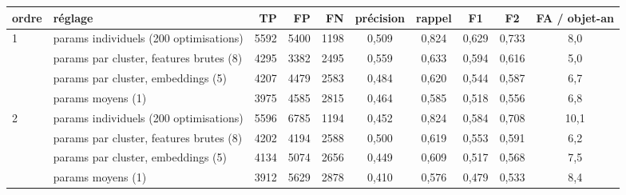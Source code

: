 \begin{tabular}{llrrrccccc}
\toprule
ordre & réglage & TP & FP & FN & précision & rappel & F1 & F2 & FA / objet-an \\
\midrule
1 & params individuels (200 optimisations) & 5592 & 5400 & 1198 & 0,509 & 0,824 & 0,629 & 0,733 & 8,0 \\
 & params par cluster, features brutes (8) & 4295 & 3382 & 2495 & 0,559 & 0,633 & 0,594 & 0,616 & 5,0 \\
 & params par cluster, embeddings (5) & 4207 & 4479 & 2583 & 0,484 & 0,620 & 0,544 & 0,587 & 6,7 \\
 & params moyens (1) & 3975 & 4585 & 2815 & 0,464 & 0,585 & 0,518 & 0,556 & 6,8 \\
\midrule
2 & params individuels (200 optimisations) & 5596 & 6785 & 1194 & 0,452 & 0,824 & 0,584 & 0,708 & 10,1 \\
 & params par cluster, features brutes (8) & 4202 & 4194 & 2588 & 0,500 & 0,619 & 0,553 & 0,591 & 6,2 \\
 & params par cluster, embeddings (5) & 4134 & 5074 & 2656 & 0,449 & 0,609 & 0,517 & 0,568 & 7,5 \\
 & params moyens (1) & 3912 & 5629 & 2878 & 0,410 & 0,576 & 0,479 & 0,533 & 8,4 \\
\bottomrule
\end{tabular}
